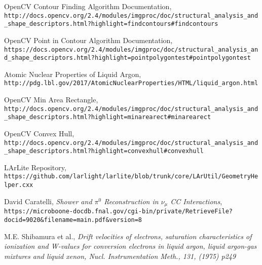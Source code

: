 \begin{thebibliography}{20}
  OpenCV Contour Finding Algorithm Documentation, \\
  \texttt{http://docs.opencv.org/2.4/modules/imgproc/doc/structural\_analysis\_and\_shape\_descriptors.html?highlight=findcontours\#findcontours}


  OpenCV Point in Contour Algorithm Documentation, \\
  \texttt{https://docs.opencv.org/2.4/modules/imgproc/doc/structural\_analysis\_and\_shape\_descriptors.html?highlight=pointpolygontest\#pointpolygontest}


  Atomic Nuclear Properties of Liquid Argon, \\
  \texttt{http://pdg.lbl.gov/2017/AtomicNuclearProperties/HTML/liquid\_argon.html}

  OpenCV Min Area Rectangle, \\
  \texttt{http://docs.opencv.org/2.4/modules/imgproc/doc/structural\_analysis\_and\_shape\_descriptors.html?highlight=minarearect\#minarearect}

  OpenCV Convex Hull, \\
  \texttt{http://docs.opencv.org/2.4/modules/imgproc/doc/structural\_analysis\_and\_shape\_descriptors.html?highlight=convexhull\#convexhull}

  LArLite Repository, \\
\texttt{https://github.com/larlight/larlite/blob/trunk/core/LArUtil/GeometryHelper.cxx}


  David Caratelli, \emph{Shower and $\pi^0$ Reconstruction in $\nu_{\mu}$ CC Interactions},\\
  \texttt{https://microboone-docdb.fnal.gov/cgi-bin/private/RetrieveFile?docid=9020\&filename=main.pdf\&version=8}

 M.E. Shibamura et al., \emph{Drift velocities of electrons, saturation characteristics of ionization
and W-values for conversion electrons in liquid argon, liquid argon-gas mixtures and liquid
xenon, Nucl. Instrumentation Meth., 131, (1975) p249}


\end{thebibliography}
